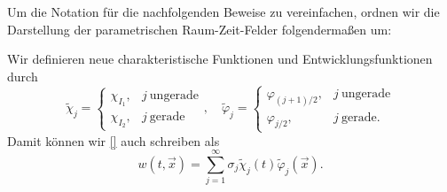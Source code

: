 Um die Notation für die nachfolgenden Beweise zu vereinfachen, ordnen wir die Darstellung der parametrischen Raum-Zeit-Felder folgendermaßen um:
\begin{Bemerkung}
    Wir definieren neue charakteristische Funktionen und Entwicklungsfunktionen durch
    \begin{equation}
        \tilde{\chi}_{j} = \begin{cases}
            \chi_{I_{1}}, & j~\text{ungerade}\\
            \chi_{I_{2}}, & j~\text{gerade}
        \end{cases}, \quad
        \tilde{\varphi}_{j} = \begin{cases}
            \varphi_{(j+1)/{2}}, & j~\text{ungerade}\\
            \varphi_{j / 2}, & j~\text{gerade}.
        \end{cases}
    \end{equation}
    Damit können wir \cref{} auch schreiben als
    \begin{equation}
        w(t, \vec{x}) = \sum_{j = 1}^{\infty} \sigma_{j} \tilde{\chi}_{j}(t) \tilde{\varphi}_{j}(\vec{x}).
    \end{equation}
\end{Bemerkung}

